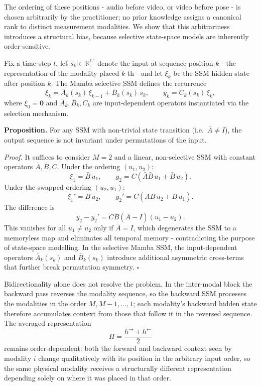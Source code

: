 \documentclass[10pt,a4paper,twocolumn]{article}
\newcommand{\R}{\mathbb{R}}
\begin{document}
	The ordering of these positions - audio before video, or video before pose - is chosen arbitrarily by the practitioner; no prior knowledge assigns a canonical rank to distinct measurement modalities. We show that this arbitrariness introduces a structural bias, because selective state-space models are inherently order-sensitive.
	
	Fix a time step $t$, let $s_k \in \R^{C'}$ denote the input at sequence position $k$ - the representation of the modality placed $k$-th - and let $\xi_k$ be the SSM hidden state after position $k$. The Mamba selective SSM \cite{gu2023mamba} defines the recurrence
	$$\xi_k = \bar{A}_k(s_k)\,\xi_{k-1} + \bar{B}_k(s_k)\,s_k, \qquad y_k = C_k(s_k)\,\xi_k,$$
	where $\xi_0 = \mathbf{0}$ and $\bar{A}_k,\bar{B}_k,C_k$ are input-dependent operators instantiated via the selection mechanism.
	
	\textbf{Proposition.} For any SSM with non-trivial state transition (i.e.\ $\bar{A} \neq I$), the output sequence is not invariant under permutations of the input.
	
	\textit{Proof.} It suffices to consider $M = 2$ and a linear, non-selective SSM with constant operators $\bar{A}, \bar{B}, C$. Under the ordering $(u_1, u_2)$:
	$$\xi_1 = \bar{B}\,u_1, \qquad y_2 = C\!\left(\bar{A}\bar{B}\,u_1 + \bar{B}\,u_2\right).$$
	Under the swapped ordering $(u_2, u_1)$:
	$$\xi_1' = \bar{B}\,u_2, \qquad y_2' = C\!\left(\bar{A}\bar{B}\,u_2 + \bar{B}\,u_1\right).$$
	The difference is
	$$y_2 - y_2' = C\bar{B}(\bar{A} - I)(u_1 - u_2).$$
	This vanishes for all $u_1 \neq u_2$ only if $\bar{A} = I$, which degenerates the SSM to a memoryless map and eliminates all temporal memory - contradicting the purpose of state-space modelling. In the selective Mamba SSM, the input-dependent operators $\bar{A}_k(s_k)$ and $\bar{B}_k(s_k)$ introduce additional asymmetric cross-terms that further break permutation symmetry. $\square$
	
	Bidirectionality alone does not resolve the problem. In the inter-modal block the backward pass reverses the modality sequence, so the backward SSM processes the modalities in the order $M, M{-}1, \dots, 1$; each modality's backward hidden state therefore accumulates context from those that follow it in the reversed sequence. The averaged representation
	$$H = \frac{h^{\rightarrow} + h^{\leftarrow}}{2}$$
	remains order-dependent: both the forward and backward context seen by modality $i$ change qualitatively with its position in the arbitrary input order, so the same physical modality receives a structurally different representation depending solely on where it was placed in that order.
	
\end{document}

